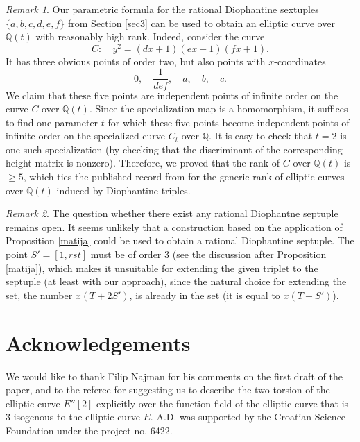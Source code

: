 \documentclass[11pt]{amsart}
\theoremstyle{plain}
\theoremstyle{remark}
\newtheorem{remark}{Remark}
\begin{document}
\begin{remark} \label{rmrank}
Our parametric formula for the rational Diophantine sextuples $\{a,b,c,d,e,f\}$ from Section \ref{sec3} can be used to obtain an elliptic curve over $\mathbb{Q}(t)$ with reasonably high rank. Indeed, consider the curve
$$
C: \quad y^2= (dx+1)(ex+1)(fx+1).
$$
It has three obvious points of order two, but also points with $x$-coordinates
$$
0, \quad \frac{1}{def},\quad a, \quad b, \quad c.
$$
We claim that these five points are independent points of infinite order on the curve $C$ over $\mathbb{Q}(t)$. Since the specialization map is a homomorphism, it suffices to find one parameter $t$ for which these five points become independent points of infinite order on the specialized curve $C_t$ over $\mathbb{Q}$. It is easy to check that $t=2$ is one such specialization (by checking that the discriminant of the corresponding height matrix is nonzero). Therefore, we proved that the rank of $C$ over $\mathbb{Q}(t)$ is $\geq 5$, which ties the published record from \cite{A-D-P} for the generic rank of elliptic curves over $\mathbb{Q}(t)$ induced by Diophantine triples.
\end{remark}

\begin{remark}
The question whether there exist any rational Diophantne septuple remains open.
It seems unlikely that a construction based on the application of Proposition \ref{matija} could be used to obtain a rational Diophantine septuple. The point $S'=[1,rst]$ must be of order $3$ (see the discussion after Proposition \ref{matija}), which makes it unsuitable for extending the given triplet to the septuple (at least with our approach), since the natural choice for extending the set, the number $x(T+2S')$, is already in the set (it is equal to $x(T-S')$).

\end{remark}

\section*{Acknowledgements}
We would like to thank Filip Najman for his comments on the first draft of the paper, and to the referee for suggesting us to describe the two torsion of the elliptic curve $E''[2]$ explicitly over the function field of the elliptic curve that is 3-isogenous to the elliptic curve $E$. A.D. was supported by the Croatian Science Foundation under the project no. 6422.


\end{document}
